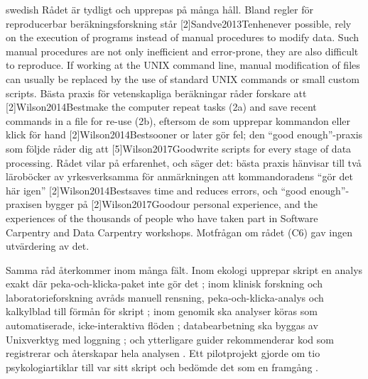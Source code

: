 \begin{onlyin}{swedish}
Rådet är tydligt och upprepas på många håll.  Bland regler för reproducerbar
beräkningsforskning står
[2]{Sandve2013Ten}{henever
possible, rely on the execution of programs instead of manual procedures
to modify data. Such manual procedures are not only inefficient and
error-prone, they are also difficult to reproduce. If working at the
UNIX command line, manual modification of files can usually be replaced
by the use of standard UNIX commands or small custom scripts.}  Bästa
praxis för vetenskapliga beräkningar råder forskare att
[2]{Wilson2014Best}{make the computer repeat
tasks (2a) and save recent commands in a file for re-use (2b)},
eftersom de som upprepar kommandon eller klick för hand
[2]{Wilson2014Best}{sooner or later} gör fel;
den \enquote{good enough}-praxis som följde råder dig att
[5]{Wilson2017Good}{write scripts for every
stage of data processing}.  Rådet vilar på erfarenhet, och säger det:
bästa praxis hänvisar till två läroböcker av yrkesverksamma för
anmärkningen att kommandoradens \enquote{gör det här igen}
[2]{Wilson2014Best}{saves time and reduces
errors}, och \enquote{good enough}-praxisen bygger på
[2]{Wilson2017Good}{our personal experience,
and \textelp{} the experiences of the thousands of people who have taken
part in Software Carpentry and Data Carpentry workshops}.  Motfrågan om
rådet (C6) gav ingen utvärdering av det.

Samma råd återkommer inom många fält.  Inom ekologi upprepar skript en
analys exakt där peka-och-klicka-paket inte gör det
\autocite{Borregaard2016Towards}; inom klinisk forskning och
laboratorieforskning avråds manuell rensning, peka-och-klicka-analys och
kalkylblad till förmån för skript
\autocite{Kaizer2026Statistical,Obstfeld2026Reproducible,%
Simons2019Reproducible}; inom genomik ska analyser köras som
automatiserade, icke-interaktiva flöden
\autocite{Vos2016Ten,Ziemann2023Recipe,Satagopam2025Best};
databearbetning ska byggas av Unixverktyg med loggning
\autocite{Spinellis2024Engineering}; och ytterligare guider
rekommenderar kod som registrerar och återskapar hela analysen
\autocite{Kelley2008R,Valle2012Computer,RodriguezSanchez2016Ciencia,%
Hutton2016Most,Petyuk2019Reproducibility,Kalenkovich2021Reproducible,%
Finley2026Scripts,Schlogl2026Overcoming}.  Ett pilotprojekt gjorde om
tio psykologiartiklar till var sitt skript och bedömde det som en
framgång \autocite{Baker2024Reproduceme}.


\end{onlyin}

